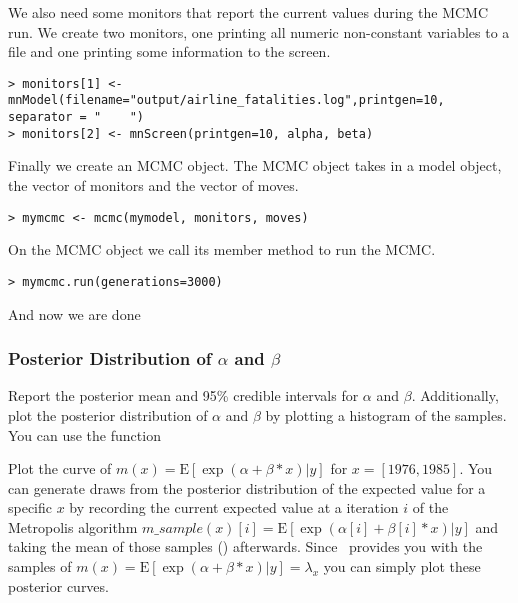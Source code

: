 We also need some monitors that report the current values during the MCMC run.
We create two monitors, one printing all numeric non-constant variables to a file and one printing some information to the screen.
{\tt \begin{snugshade*}
\begin{lstlisting} 
> monitors[1] <- mnModel(filename="output/airline_fatalities.log",printgen=10, separator = "	")
> monitors[2] <- mnScreen(printgen=10, alpha, beta)
\end{lstlisting}
\end{snugshade*}}
Finally we create an MCMC object.
The MCMC object takes in a model object, the vector of monitors and the vector of moves.
{\tt \begin{snugshade*}
\begin{lstlisting} 
> mymcmc <- mcmc(mymodel, monitors, moves)
\end{lstlisting}
\end{snugshade*}}
On the MCMC object we call its member method  to run the MCMC.
{\tt \begin{snugshade*}
\begin{lstlisting} 
> mymcmc.run(generations=3000)
\end{lstlisting}
\end{snugshade*}}
And now we are done {\LARGE \smiley}


\subsubsection*{Posterior Distribution of $\alpha$ and $\beta$}
 
Report the posterior mean and 95\% credible intervals for $\alpha$ and $\beta$. 
Additionally, plot the posterior distribution of $\alpha$ and $\beta$ by plotting a histogram of the samples. 
You can use the \R function

Plot the curve of $m(x) = \text{E}[\exp(\alpha+\beta*x)|y]$ for $x = [1976,1985]$. 
You can generate draws from the posterior distribution of the expected value for a specific $x$ by recording the current expected value at a iteration $i$ of the Metropolis algorithm $m\_sample(x)[i] = \text{E}[\exp(\alpha[i]+\beta[i]*x)|y]$ and taking the mean of those samples () afterwards. Since \RevBayes~provides you with the samples of $m(x) = \text{E}[\exp(\alpha+\beta*x)|y] = \lambda_x$ you can simply plot these posterior curves.
 
